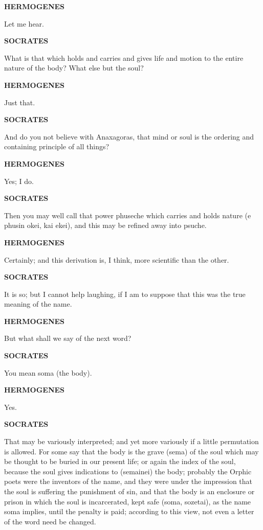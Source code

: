 \documentclass[11pt,letter]{article}
\begin{document}
\par \textbf{HERMOGENES}
\par   Let me hear.

\par \textbf{SOCRATES}
\par   What is that which holds and carries and gives life and motion to the entire nature of the body? What else but the soul?

\par \textbf{HERMOGENES}
\par   Just that.

\par \textbf{SOCRATES}
\par   And do you not believe with Anaxagoras, that mind or soul is the ordering and containing principle of all things?

\par \textbf{HERMOGENES}
\par   Yes; I do.

\par \textbf{SOCRATES}
\par   Then you may well call that power phuseche which carries and holds nature (e phusin okei, kai ekei), and this may be refined away into psuche.

\par \textbf{HERMOGENES}
\par   Certainly; and this derivation is, I think, more scientific than the other.

\par \textbf{SOCRATES}
\par   It is so; but I cannot help laughing, if I am to suppose that this was the true meaning of the name.

\par \textbf{HERMOGENES}
\par   But what shall we say of the next word?

\par \textbf{SOCRATES}
\par   You mean soma (the body).

\par \textbf{HERMOGENES}
\par   Yes.

\par \textbf{SOCRATES}
\par   That may be variously interpreted; and yet more variously if a little permutation is allowed. For some say that the body is the grave (sema) of the soul which may be thought to be buried in our present life; or again the index of the soul, because the soul gives indications to (semainei) the body; probably the Orphic poets were the inventors of the name, and they were under the impression that the soul is suffering the punishment of sin, and that the body is an enclosure or prison in which the soul is incarcerated, kept safe (soma, sozetai), as the name soma implies, until the penalty is paid; according to this view, not even a letter of the word need be changed.
\end{document}
